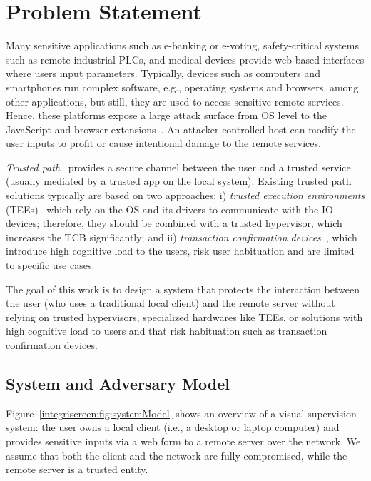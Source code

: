 \section{Problem Statement}
\label{sec:problemStatement}

Many sensitive applications such as e-banking or e-voting, safety-critical systems such as remote industrial PLCs, and medical devices provide web-based interfaces where users input parameters.
Typically, devices such as computers and smartphones run complex software, e.g., operating systems and browsers, among other applications, but still, they are used to access sensitive remote services. Hence, these platforms expose a large attack surface from OS level to the JavaScript and browser extensions~\cite{driveByDownload, extensionSecurity, extensionSecurity1, extensionHack1, microsoftPatches, kernelSecurity, linuxMalware, zeusMalware, wannacry}. An attacker-controlled host can modify the user inputs to profit or cause intentional damage to the remote services.

\emph{Trusted path}~\cite{x86} provides a secure channel between the user and a trusted service (usually mediated by a trusted app on the local system).
Existing trusted path solutions typically are based on two approaches: i) \textit{trusted execution environments} (TEEs)~\cite{sgxio} which rely on the OS and its drivers to communicate with the IO devices; therefore, they should be combined with a trusted hypervisor, which increases the TCB significantly; and ii) \textit{transaction confirmation devices}~\cite{filyanov2011uni}, which introduce high cognitive load to the users, risk user habituation and are limited to specific use cases.

The goal of this work is to design a system that protects the interaction between the user (who uses a traditional local client) and the remote server without relying on trusted hypervisors, specialized hardwares like TEEs, or solutions with high cognitive load to users and that risk habituation such as transaction confirmation devices.

\subsection{System and Adversary Model}
\label{sec:problemStatement:systemMode}

Figure~\ref{integriscreen:fig:systemModel} shows an overview of a visual supervision system: the user owns a local client (i.e., a desktop or laptop computer) and provides sensitive inputs via a web form to a remote server over the network. We assume that both the client and the network are fully compromised, while the remote server is a trusted entity. 

